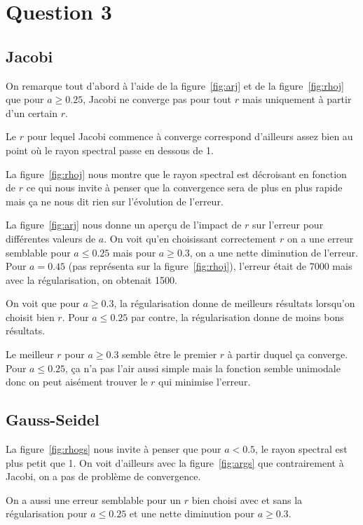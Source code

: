 \section{Question 3}

\subsection{Jacobi}
On remarque tout d'abord à l'aide de la figure~\ref{fig:arj}
et de la figure~\ref{fig:rhoj} que pour $a \geq 0.25$,
Jacobi ne converge pas pour tout $r$ mais uniquement à partir
d'un certain $r$.

Le $r$ pour lequel Jacobi commence à converge correspond d'ailleurs
assez bien au point où le rayon spectral passe en dessous de 1.

La figure~\ref{fig:rhoj} nous montre que le rayon spectral est
décroisant en fonction de $r$ ce qui nous invite à penser que
la convergence sera de plus en plus rapide mais ça ne nous
dit rien sur l'évolution de l'erreur.

La figure~\ref{fig:arj} nous donne un aperçu de l'impact de $r$
sur l'erreur pour différentes valeurs de $a$.
On voit qu'en choisissant correctement $r$ on a une erreur semblable
pour $a \leq 0.25$ mais pour $a \geq 0.3$, on a une nette
diminution de l'erreur.
Pour $a = 0.45$ (pas représenta sur la figure~\ref{fig:rhoj}),
l'erreur était de 7000 mais avec la régularisation, on obtenait
1500.

On voit que pour $a \geq 0.3$, la régularisation donne de meilleurs résultats
lorsqu'on choisit bien $r$.
Pour $a \leq 0.25$ par contre, la régularisation donne de moins bons résultats.

Le meilleur $r$ pour $a \geq 0.3$ semble être le premier $r$ à partir duquel
ça converge.
Pour $a \leq 0.25$, ça n'a pas l'air aussi simple mais la fonction semble
unimodale donc on peut aisément trouver le $r$ qui minimise l'erreur.

\subsection{Gauss-Seidel}
La figure~\ref{fig:rhogs} nous invite à penser que pour
$a < 0.5$, le rayon spectral est plus petit que 1.
On voit d'ailleurs avec la figure~\ref{fig:args} que contrairement
à Jacobi, on a pas de problème de convergence.

On a aussi une erreur semblable pour un $r$ bien choisi
avec et sans la régularisation pour $a \leq 0.25$ et une nette
diminution pour $a \geq 0.3$.

